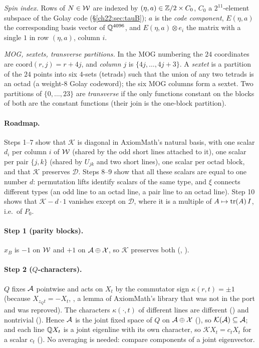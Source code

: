 \emph{Spin index.}  Rows of $N\in\mathcal{W}$ are indexed by $(\eta,a)\in{\mathbb{Z}}/2\times C_0$, $C_0$ a $2^{11}$-element subspace of
the Golay code (\S\ref{ch22:sec:tauB}); $a$ is the \emph{code component}, $E(\eta,a)$ the corresponding basis vector of
${\mathbb{Q}}^{4096}$, and $E(\eta,a)\otimes e_i$ the matrix with a single $1$ in row $(\eta,a)$, column $i$.

\emph{MOG, sextets, transverse partitions.}  In the MOG numbering the $24$ coordinates are $\mathrm{coord}(r,j)=r+4j$, and
\emph{column} $j$ is $\{4j,\dots,4j+3\}$.  A \emph{sextet} is a partition of the $24$ points into six $4$-sets (tetrads) such
that the union of any two tetrads is an octad (a weight-$8$ Golay codeword); the six MOG columns form a sextet.  Two
partitions of $\{0,\dots,23\}$ are \emph{transverse} if the only functions constant on the blocks of both are the constant
functions (their join is the one-block partition).

\paragraph{Roadmap.}  Steps 1--7 show that $\mathcal K$ is diagonal in AxiomMath's natural basis, with one scalar $d_i$ per column
$i$ of $\mathcal{W}$ (shared by the odd short lines attached to it), one scalar per pair $\{j,k\}$ (shared by $U_{jk}$ and two
short lines), one scalar per octad block, and that $\mathcal K$ preserves $\mathcal D$.  Steps 8--9 show that all these scalars are
equal to one number $d$: permutation lifts identify scalars of the same type, and $\xi$ connects different types (an odd line to
an octad line, a pair line to an octad line).  Step 10 shows that $\mathcal K-d\cdot1$ vanishes except on $\mathcal D$, where it is
a multiple of $A\mapsto\operatorname{tr}(A)\,I$, i.e.\ of $P_0$.

\paragraph{Step 1 (parity blocks).}  $x_B$ is $-1$ on $\mathcal{W}$ and $+1$ on $\mathcal{A}\oplus\mathcal{X}$, so
$\mathcal K$ preserves both (, ).

\paragraph{Step 2 ($Q$-characters).}  $Q$ fixes $\mathcal{A}$ pointwise and acts on $X_t$ by the commutator sign
$\kappa(r,t)=\pm1$ (because $X_{z_Qt}=-X_t$, , a lemma of AxiomMath's library that was not in the port
and was reproved).  The characters $\kappa(\cdot,t)$ of different lines are different () and
nontrivial ().  Hence $\mathcal{A}$ is the joint fixed space of $Q$ on
$\mathcal{A}\oplus\mathcal{X}$ (), so $\mathcal K(\mathcal{A})\subseteq\mathcal{A}$; and each line ${\mathbb{Q}}
X_t$ is a joint eigenline with its own character, so $\mathcal KX_t=c_tX_t$ for a scalar $c_t$ ().  No
averaging is needed: compare components of a joint eigenvector.

